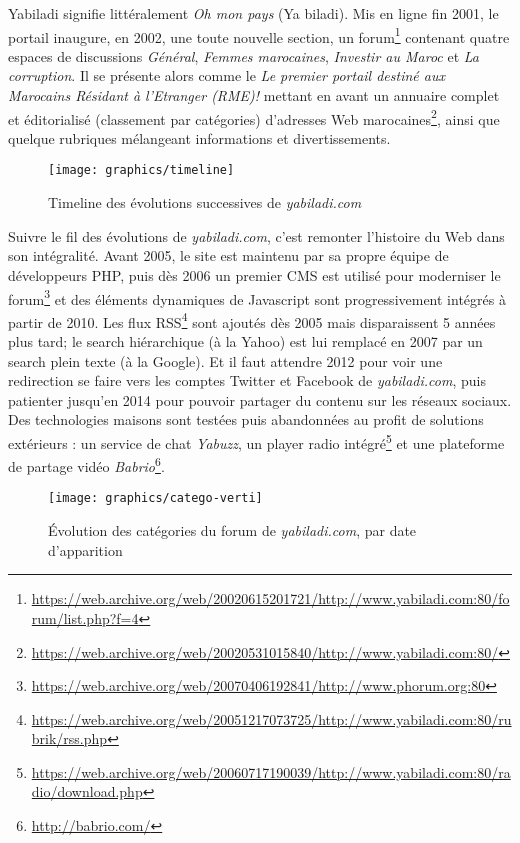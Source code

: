 \documentclass[symmetric,justified,marginals=raggedouter]{tufte-book}
\begin{document}
Yabiladi signifie littéralement \textit{Oh mon pays} (Ya biladi). Mis en ligne fin 2001, le portail inaugure, en 2002, une toute nouvelle section, un forum\footnote{\RaggedOuter \url{https://web.archive.org/web/20020615201721/http://www.yabiladi.com:80/forum/list.php?f=4}} contenant quatre espaces de discussions \textit{Général}, \textit{Femmes marocaines}, \textit{Investir au Maroc} et \textit{La corruption}. Il se présente alors comme le \og\textit{Le premier portail destiné aux Marocains Résidant à l'Etranger (RME)!}\fg{} mettant en avant un annuaire complet et éditorialisé (classement par catégories) d'adresses Web marocaines\footnote{\RaggedOuter \url{https://web.archive.org/web/20020531015840/http://www.yabiladi.com:80/}}, ainsi que quelque rubriques mélangeant informations et divertissements. 

\begin{figure*}
  \texttt{[image: graphics/timeline]}
  \caption{Timeline des évolutions successives de \textit{yabiladi.com}}
  \label{fig:timeline}
\end{figure*} 

\noindent Suivre le fil des évolutions de \textit{yabiladi.com}, c'est remonter l'histoire du Web dans son intégralité. Avant 2005, le site est maintenu par sa propre équipe de développeurs PHP, puis dès 2006 un premier CMS est utilisé pour moderniser le forum\footnote{\RaggedOuter \url{https://web.archive.org/web/20070406192841/http://www.phorum.org:80}} et des éléments dynamiques de Javascript sont progressivement intégrés à partir de 2010. Les flux RSS\footnote{\RaggedOuter \url{https://web.archive.org/web/20051217073725/http://www.yabiladi.com:80/rubrik/rss.php}} sont ajoutés dès 2005 mais disparaissent 5 années plus tard; le search hiérarchique (à la Yahoo) est lui remplacé en 2007 par un search plein texte (à la Google). Et il faut attendre 2012 pour voir une redirection se faire vers les comptes Twitter et Facebook de \textit{yabiladi.com}, puis patienter jusqu'en 2014 pour pouvoir partager du contenu sur les réseaux sociaux. Des technologies maisons sont testées puis abandonnées au profit de solutions extérieurs : un service de chat \textit{Yabuzz}, un player radio intégré\footnote{\RaggedOuter \url{https://web.archive.org/web/20060717190039/http://www.yabiladi.com:80/radio/download.php}} et une plateforme de partage vidéo \textit{Babrio}\footnote{\RaggedOuter \url{http://babrio.com/}}.

\begin{figure*}[hbtp]%
  \texttt{[image: graphics/catego-verti]}
  \caption{Évolution des catégories du forum de \textit{yabiladi.com}, par date d'apparition}
  \label{fig:categories}
\end{figure*}
\end{document}
